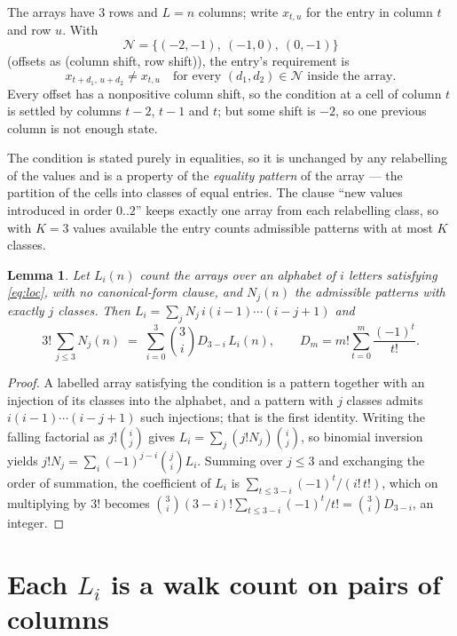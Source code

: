 \documentclass[11pt,a4paper]{article}
\theoremstyle{plain}
\newtheorem{lemma}[theorem]{Lemma}
\theoremstyle{definition}
\begin{document}
The arrays have $3$ rows and $L=n$ columns; write $x_{t,u}$ for the entry in
column $t$ and row $u$. With
\[
\mathcal N=\{(-2,-1),\ (-1,0),\ (0,-1)\}
\]
(offsets as (column shift, row shift)), the entry's requirement is
\begin{equation}\label{eq:loc}
x_{t+d_1,\,u+d_2}\ne x_{t,u}\quad\text{for every }(d_1,d_2)\in\mathcal N\text{ inside the array}.
\end{equation}
Every offset has a nonpositive column shift, so the condition at a cell of column $t$ is
settled by columns $t-2$, $t-1$ and $t$; but some shift is $-2$, so one previous column is not
enough state.

The condition is stated purely in equalities, so it is unchanged by any relabelling of the
values and is a property of the \emph{equality pattern} of the array --- the partition of
the cells into classes of equal entries. The clause ``new values introduced in order
$0..2$'' keeps exactly one array from each relabelling class, so with $K=3$ values
available the entry counts admissible patterns with at most $K$ classes.

\begin{lemma}\label{lem:inv}
Let $L_i(n)$ count the arrays over an alphabet of $i$ letters satisfying \eqref{eq:loc},
with no canonical-form clause, and $N_j(n)$ the admissible patterns with exactly $j$ classes.
Then $L_i=\sum_j N_j\,i(i-1)\cdots(i-j+1)$ and
\[
3!\,\sum_{j\le 3}N_j(n)\;=\;\sum_{i=0}^{3}\binom{3}{i}D_{3-i}\,L_i(n),
\qquad D_m=m!\sum_{t=0}^{m}\frac{(-1)^t}{t!} .
\]
\end{lemma}

\begin{proof}
A labelled array satisfying the condition is a pattern together with an injection of its
classes into the alphabet, and a pattern with $j$ classes admits $i(i-1)\cdots(i-j+1)$ such
injections; that is the first identity. Writing the falling factorial as $j!\binom{i}{j}$
gives $L_i=\sum_j(j!N_j)\binom{i}{j}$, so binomial inversion yields
$j!N_j=\sum_i(-1)^{j-i}\binom{j}{i}L_i$. Summing over $j\le3$ and exchanging the
order of summation, the coefficient of $L_i$ is $\sum_{t\le3-i}(-1)^t/(i!\,t!)$, which on
multiplying by $3!$ becomes
$\binom{3}{i}(3-i)!\sum_{t\le3-i}(-1)^t/t!=\binom{3}{i}D_{3-i}$, an
integer.
\end{proof}

\section{Each $L_i$ is a walk count on pairs of columns}
\end{document}
